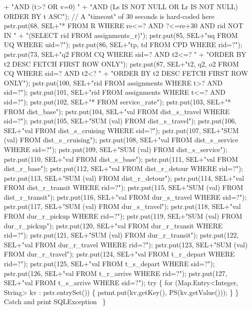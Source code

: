 \documentclass{article}
\def\nwendcode{\endtrivlist \endgroup}
\theoremstyle{definition}
\begin{document}
      + "AND (t>? OR v=0) "
      + "AND (Ls IS NOT NULL OR Lr IS NOT NULL) ORDER BY t ASC");
  // A "timeout" of 30 seconds is hard-coded here
  pstr.put(68, SEL+"* FROM R WHERE re<=? AND ?<=re+30 AND rid NOT IN  "
      + "(SELECT rid FROM assignments_r)");
  pstr.put(85, SEL+"uq FROM UQ WHERE uid=?");
  pstr.put(86, SEL+"tp, td FROM CPD WHERE rid=?");
  pstr.put(73, SEL+"q2 FROM CQ WHERE sid=? AND t2<=? "
      + "ORDER BY t2 DESC FETCH FIRST ROW ONLY");
  pstr.put(87, SEL+"t2, q2, o2 FROM CQ WHERE sid=? AND t2<? "
      + "ORDER BY t2 DESC FETCH FIRST ROW ONLY");
  pstr.put(100, SEL+"rid FROM assignments WHERE t>? AND sid=?");
  pstr.put(101, SEL+"rid FROM assignments WHERE t<=? AND sid=?");
  pstr.put(102, SEL+"* FROM service_rate");
  pstr.put(103, SEL+"* FROM dist_base");
  pstr.put(104, SEL+"val FROM dist_s_travel WHERE sid=?");
  pstr.put(105, SEL+"SUM (val) FROM dist_s_travel");
  pstr.put(106, SEL+"val FROM dist_s_cruising WHERE sid=?");
  pstr.put(107, SEL+"SUM (val) FROM dist_s_cruising");
  pstr.put(108, SEL+"val FROM dist_s_service WHERE sid=?");
  pstr.put(109, SEL+"SUM (val) FROM dist_s_service");
  pstr.put(110, SEL+"val FROM dist_s_base");
  pstr.put(111, SEL+"val FROM dist_r_base");
  pstr.put(112, SEL+"val FROM dist_r_detour WHERE rid=?");
  pstr.put(113, SEL+"SUM (val) FROM dist_r_detour");
  pstr.put(114, SEL+"val FROM dist_r_transit WHERE rid=?");
  pstr.put(115, SEL+"SUM (val) FROM dist_r_transit");
  pstr.put(116, SEL+"val FROM dur_s_travel WHERE sid=?");
  pstr.put(117, SEL+"SUM (val) FROM dur_s_travel");
  pstr.put(118, SEL+"val FROM dur_r_pickup WHERE rid=?");
  pstr.put(119, SEL+"SUM (val) FROM dur_r_pickup");
  pstr.put(120, SEL+"val FROM dur_r_transit WHERE rid=?");
  pstr.put(121, SEL+"SUM (val) FROM dur_r_transit");
  pstr.put(122, SEL+"val FROM dur_r_travel WHERE rid=?");
  pstr.put(123, SEL+"SUM (val) FROM dur_r_travel");
  pstr.put(124, SEL+"val FROM t_r_depart WHERE rid=?");
  pstr.put(125, SEL+"val FROM t_s_depart WHERE sid=?");
  pstr.put(126, SEL+"val FROM t_r_arrive WHERE rid=?");
  pstr.put(127, SEL+"val FROM t_s_arrive WHERE sid=?");
  try \{
    for (Map.Entry<Integer, String> kv : pstr.entrySet()) \{
      pstmt.put(kv.getKey(), PS(kv.getValue()));
    \}
  \}
  \LA{}Catch and print \code{}SQLException\edoc{}~{\nwtagstyle{}}\RA{}
\}
\eatline
{}\nwendcode{}
\end{document}
